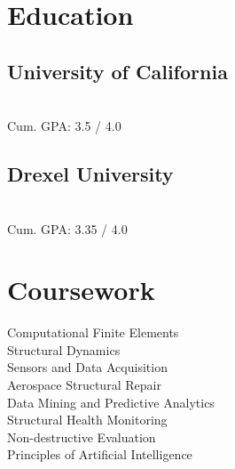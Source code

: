 \documentclass[letterpaper]{deedy-resume-openfont}
\begin{document}
%
%

%
%


%
%

\begin{minipage}[t]{0.3\textwidth} 


\section{Education} 

\subsection{\large University of California}
\\
Cum. GPA: 3.5 / 4.0
\sectionsep

\subsection{\large Drexel University}
\\
Cum. GPA: 3.35 / 4.0
\vspace{-0.2cm}
\sectionsep




\section{Coursework}
\vspace{-0.1cm}
Computational Finite Elements \\
Structural Dynamics\\
Sensors and Data Acquisition\\
Aerospace Structural Repair \\
Data Mining and Predictive Analytics \\ 
Structural Health Monitoring \\
Non-destructive Evaluation\\
Principles of Artificial Intelligence\\


\end{minipage}
\end{document}

